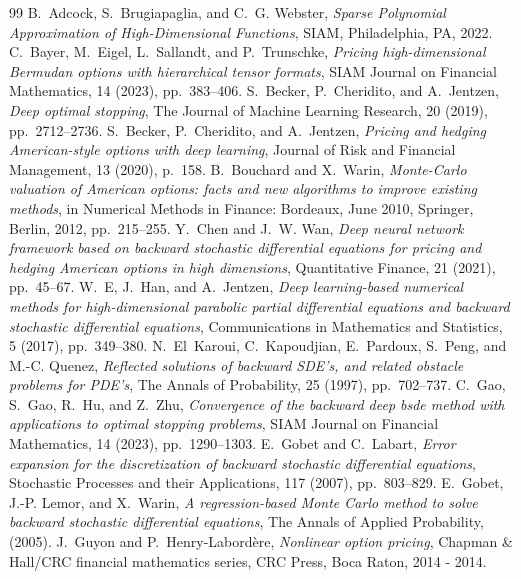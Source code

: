 \documentclass[10pt,a4paper]{amsart}
\numberwithin{equation}{section}
\numberwithin{algorithm}{section}
\theoremstyle{plain}
\theoremstyle{remark}
\begin{document}
\begin{thebibliography}{99}
 {\sc B.~Adcock, S.~Brugiapaglia, and C.~G. Webster}, {\em {Sparse Polynomial Approximation of High-Dimensional Functions}}, SIAM, Philadelphia, PA, 2022.
 {\sc C.~Bayer, M.~Eigel, L.~Sallandt, and P.~Trunschke}, {\em Pricing high-dimensional {B}ermudan options with hierarchical tensor formats}, SIAM Journal on Financial Mathematics, 14 (2023), pp.~383--406.
 {\sc S.~Becker, P.~Cheridito, and A.~Jentzen}, {\em Deep optimal stopping}, The Journal of Machine Learning Research, 20 (2019), pp.~2712--2736.
 {\sc S.~Becker, P.~Cheridito, and A.~Jentzen}, {\em Pricing and hedging {A}merican-style options with deep learning}, Journal of Risk and Financial Management, 13 (2020), p.~158.
 {\sc B.~Bouchard and X.~Warin}, {\em {M}onte-{C}arlo valuation of {A}merican options: facts and new algorithms to improve existing methods}, in Numerical Methods in Finance: Bordeaux, June 2010, Springer, Berlin, 2012, pp.~215--255.
 {\sc Y.~Chen and J.~W. Wan}, {\em Deep neural network framework based on backward stochastic differential equations for pricing and hedging {A}merican options in high dimensions}, Quantitative Finance, 21 (2021), pp.~45--67.
 {\sc W.~E, J.~Han, and A.~Jentzen}, {\em Deep learning-based numerical methods for high-dimensional parabolic partial differential equations and backward stochastic differential equations}, Communications in Mathematics and Statistics, 5 (2017), pp.~349--380.
 {\sc N.~El~Karoui, C.~Kapoudjian, E.~Pardoux, S.~Peng, and M.-C. Quenez}, {\em Reflected solutions of backward {SDE}'s, and related obstacle problems for {PDE}'s}, The Annals of Probability, 25 (1997), pp.~702--737.
 {\sc C.~Gao, S.~Gao, R.~Hu, and Z.~Zhu}, {\em Convergence of the backward deep bsde method with applications to optimal stopping problems}, SIAM Journal on Financial Mathematics, 14 (2023), pp.~1290--1303.
 {\sc E.~Gobet and C.~Labart}, {\em Error expansion for the discretization of backward stochastic differential equations}, Stochastic Processes and their Applications, 117 (2007), pp.~803--829.
 {\sc E.~Gobet, J.-P. Lemor, and X.~Warin}, {\em A regression-based {M}onte {C}arlo method to solve backward stochastic differential equations}, The Annals of Applied Probability, (2005).
 {\sc J.~Guyon and P.~Henry-Labordère}, {\em Nonlinear option pricing}, Chapman \& Hall/CRC financial mathematics series, CRC Press, Boca Raton, 2014 - 2014.

\end{thebibliography}
\end{document}
